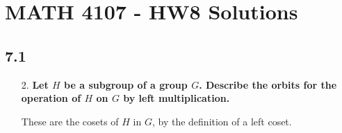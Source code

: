 \documentclass[a4paper,12pt]{article}
\begin{document}
\section*{MATH 4107 - HW8 Solutions}

\subsection*{7.1}
\begin{enumerate}
    \item[2.]
        \boldmath
        \textbf{Let $H$ be a subgroup of a group $G$. Describe the orbits for the operation of $H$ on $G$ by left multiplication.} \par
        \unboldmath
        These are the cosets of $H$ in $G$, by the definition of a left coset.
\end{enumerate}
\end{document}
